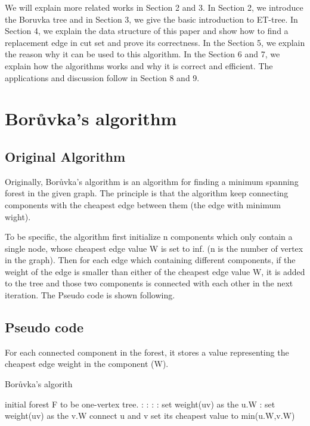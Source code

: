 \documentclass[conference,compsoc]{IEEEtran}
\begin{document}
We will explain more related works in Section 2 and 3. In Section 2, we introduce the Boruvka tree and in Section 3, we give the basic introduction to ET-tree. In Section 4, we explain the data structure of this paper and show how to find a replacement edge in cut set and prove its correctness. In the Section 5, we explain the reason why it can be used to this algorithm. In the Section 6 and 7, we explain how the algorithms works and why it is correct and efficient. The applications and discussion follow in Section 8 and 9.

\section{Borůvka's algorithm}
\subsection{Original Algorithm}
Originally, Borůvka's algorithm is an algorithm for finding a minimum spanning forest in the given graph. The principle is that the algorithm keep connecting components with the cheapest edge between them (the edge with minimum wight).
\par
To be specific, the algorithm first initialize n components which only contain a single node, whose cheapest edge value W is set to inf. (n is the number of vertex in the graph). Then for each edge which containing different components, if the weight of the edge is smaller than either of the cheapest edge value W, it is added to the tree and those two components is connected with each other in the next iteration. 
The Pseudo code is shown following.

\subsection{Pseudo code}
For each connected component in the forest, it stores a value representing the cheapest edge weight in the component (W).
\begin{algorithm}[H]
\caption{Borůvka's algorith}
\begin{algorithmic}[1]
\State initial forest F to be one-vertex tree.
:
	:
		:
			:
				\State set weight(uv) as the u.W
			\EndIf
			:
				\State set weight(uv) as the v.W
			\EndIf
		\EndIf
	\EndFor
		\State connect u and v
		\State set its cheapest value to min(u.W,v.W)
	\EndFor
\EndWhile
\end{algorithmic}
\end{algorithm}
\end{document}
